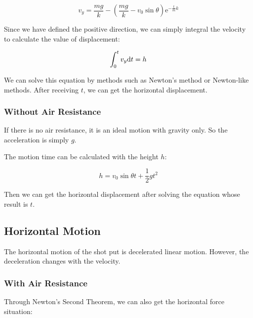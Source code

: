\documentclass{article}
\begin{document}
\begin{equation}
    v_y=\dfrac{mg}{k}-\left(\dfrac{mg}{k}-v_0\sin\theta\right)\mathrm{e}^{-\frac{t}{m}k} \label{eq:vertical-velocity}
\end{equation}

Since we have defined the positive direction, we can simply integral the velocity to calculate the value of displacement:

\begin{equation}
    \int^t_0v_y\mathrm{d} t=h
\end{equation}

We can solve this equation by methods such as Newton's method or Newton-like methods. After receiving $t$, we can get the horizontal displacement.

\subsubsection{Without Air Resistance}

\label{subsubsection:vertical-motion-without-residence}

If there is no air resistance, it is an ideal motion with gravity only. So the acceleration is simply $g$.

The motion time can be calculated with the height $h$:

\begin{equation}
    h = v_0\sin\theta t + \dfrac{1}{2}gt^2
\end{equation}

Then we can get the horizontal displacement after solving the equation whose result is $t$.

\subsection{Horizontal Motion}

\label{subsection:horizontal-motion}

The horizontal motion of the shot put is decelerated linear motion. However, the deceleration changes with the velocity.

\subsubsection{With Air Resistance}

\label{subsubsection:horizontal-motion-with-residence}

Through Newton's Second Theorem, we can also get the horizontal force situation:
\end{document}

